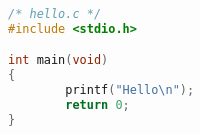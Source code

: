 \documentclass[nofonts]{ctexart}
\begin{document}
\begin{lstlisting}[language = C]
/* hello.c */
#include <stdio.h>

int main(void)
{
        printf("Hello\n");
        return 0;
}
\end{lstlisting}
\end{document}
